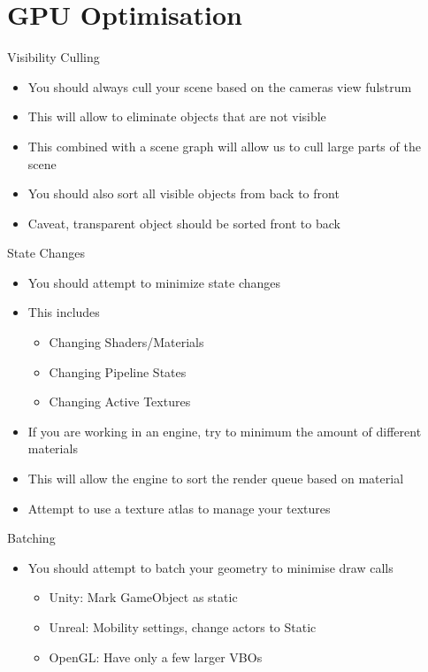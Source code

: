 \part{GPU Optimisation}
\frame{\partpage}

\begin{frame}{Visibility Culling}
\begin{itemize}
	\pause \item You should always cull your scene based on the cameras view fulstrum
	\pause \item This will allow to eliminate objects that are not visible
	\pause \item This combined with a scene graph will allow us to cull large parts of the scene
	\pause \item You should also sort all visible objects from back to front
	\pause \item Caveat, transparent object should be sorted front to back   
\end{itemize}
\end{frame}

\begin{frame}{State Changes}
	\begin{itemize}
		\pause \item You should attempt to minimize state changes
		\pause \item This includes
		\begin{itemize}
			\pause \item Changing Shaders/Materials
			\pause \item Changing Pipeline States
			\pause \item Changing Active Textures
		\end{itemize} 
		\pause \item If you are working in an engine, try to minimum the amount of different materials
		\pause \item This will allow the engine to sort the render queue based on material
		\pause \item Attempt to use a texture atlas to manage your textures
	\end{itemize}
\end{frame}

\begin{frame}{Batching}
	\begin{itemize}
		\pause \item You should attempt to batch your geometry to minimise draw calls
		\begin{itemize}
			\pause \item Unity: Mark GameObject as static
			\pause \item Unreal: Mobility settings, change actors to Static
			\pause \item OpenGL: Have only a few larger VBOs  
		\end{itemize} 
	\end{itemize}
\end{frame}

